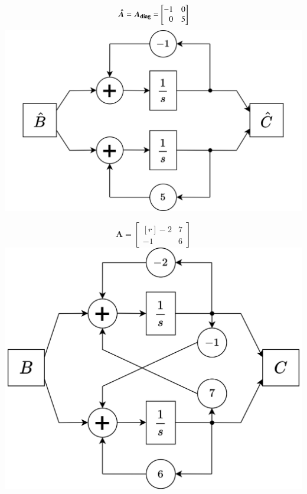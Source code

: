 \begin{minipage}[t]{0.4\columnwidth}
    \begin{center}
    \end{center}
    $$ \bm{\hat{A}} = \bm{A_{\rm diag}} = \begin{bmatrix*}[r] -1 & 0 \\ 0 & 5 \end{bmatrix*} $$
    \includegraphics[width=\columnwidth]{images/parallelform.png}
\end{minipage}
\hfill
\begin{minipage}[t]{0.48\columnwidth}
    \begin{center}
    \end{center}
    $$ \bm{A} = \begin{bmatrix*}[r] -2 & 7 \\ -1 & 6 \end{bmatrix*} $$
    \includegraphics[width=\columnwidth]{images/kreuzform.png}
\end{minipage}


